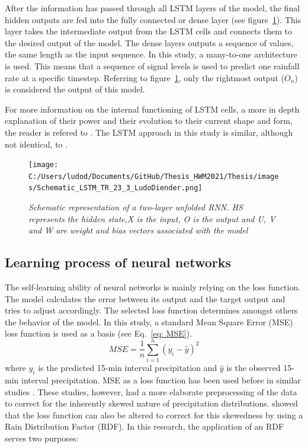 \documentclass[twocolumn, 10pt, a4paper]{memoir}
\begin{document}
	After the information has passed through all LSTM layers of the model, the final hidden outputs are fed into the fully connected or dense layer (see figure~\ref{fig: multilayer RNN}). This layer takes the intermediate output from the LSTM cells and connects them to the desired output of the model. The dense layers outputs a sequence of values, the same length as the input sequence. In this study, a many-to-one architecture is used. This means that a sequence of signal levels is used to predict one rainfall rate at a specific timestep. Referring to figure~\ref{fig: multilayer RNN}, only the rightmost output ($O_n$) is considered the output of this model.
	
	For more information on the internal functioning of LSTM cells, a more in depth explanation of their power and their evolution to their current shape and form, the reader is refered to .
	The LSTM approach in this study is similar, although not identical, to . 
	
	\begin{figure}
		\center
		\texttt{[image: C:/Users/ludod/Documents/GitHub/Thesis\_HWM2021/Thesis/images/Schematic\_LSTM\_TR\_23\_3\_LudoDiender.png]}
		\caption{\textit{Schematic representation of a two-layer unfolded RNN. HS represents the hidden state,X is the input, O is the output and U, V and W are weight and bias vectors associated with the model}}
		\label{fig: multilayer RNN}
	\end{figure}
	
	\subsection{Learning process of neural networks} \label{sec: Learning NN}
	The self-learning ability of neural networks is mainly relying on the loss function. The model calculates the error between its output and the target output and tries to adjust accordingly. The selected loss function determines amongst others the behavior of the model. In this study, a standard Mean Square Error (MSE) loss function is used as a basis (see Eq.~\ref{eq: MSE}).
	\begin{equation} \label{eq: MSE}
		MSE = \frac{1}{n} \sum_{i=1}^{n} (y_i - \hat{y})^2
	\end{equation}
	where ${y_i}$ is the predicted 15-min interval precipitation and $\hat{y}$ is the observed 15-min interval precipitation.
	MSE as a loss function has been used before in similar studies \cite{Pudashine2020, Diba2021}. These studies, however, had a more elaborate preprocessing of the data to correct for the inherently skewed nature of precipitation distributions.  showed that the loss function can also be altered to correct for this skewedness by using a Rain Distribution Factor (RDF). In this research, the application of an RDF serves two purposes:
	
\end{document}
